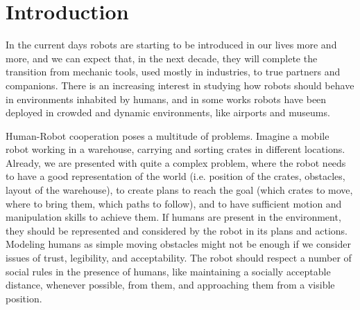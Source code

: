 
\chapter{Introduction} %

\label{chapter-introduction} %



In the current days robots are starting to be introduced in our lives more and more, and we can expect that, in the next decade, they will complete the transition from mechanic tools, used mostly in industries, to true partners and companions. There is an increasing interest in studying how robots should behave in environments inhabited by humans, and in some works robots have been deployed in crowded and dynamic environments, like airports and museums.

Human-Robot cooperation poses a multitude of problems. Imagine a mobile robot working in a warehouse, carrying and sorting crates in different locations. Already, we are presented with quite a complex problem, where the robot needs to have a good representation of the world (i.e. position of the crates, obstacles, layout of the warehouse), to create plans to reach the goal (which crates to move, where to bring them, which paths to follow), and to have sufficient motion and manipulation skills to achieve them. If humans are present in the environment, they should be represented and considered by the robot in its plans and actions.  Modeling humans as simple moving obstacles might not be enough if we consider issues of trust, legibility, and acceptability. The robot should respect a number of social rules in the presence of humans, like maintaining a socially acceptable distance, whenever possible, from them, and approaching them from a visible position.

